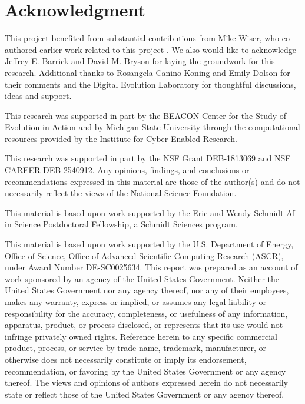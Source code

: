 \section*{Acknowledgment}

This project benefited from substantial contributions from Mike Wiser, who co-authored earlier work related to this project \citep{lalejini2017gene}.
We also would like to acknowledge Jeffrey E. Barrick and David M. Bryson for laying the groundwork for this research.
Additional thanks to Rosangela Canino-Koning and Emily Dolson for their comments and the Digital Evolution Laboratory for thoughtful discussions, ideas and support.

This research was supported in part by the BEACON Center for the Study of Evolution in Action and by Michigan State University through the computational resources provided by the Institute for Cyber-Enabled Research.

This research was supported in part by the NSF Grant DEB-1813069 and NSF CAREER DEB-2540912.
Any opinions, findings, and conclusions or recommendations expressed in this material are those of the author(s) and do not necessarily reflect the views of the National Science Foundation.

This material is based upon work supported by the Eric and Wendy Schmidt AI in Science Postdoctoral Fellowship, a Schmidt Sciences program.

This material is based upon work supported by the U.S. Department of Energy, Office of Science, Office of Advanced Scientific Computing Research (ASCR), under Award Number DE-SC0025634.
This report was prepared as an account of work sponsored by an agency of the United States Government.
Neither the United States Government nor any agency thereof, nor any of their employees, makes any warranty, express or implied, or assumes any legal liability or responsibility for the accuracy, completeness, or usefulness of any information, apparatus, product, or process disclosed, or represents that its use would not infringe privately owned rights.
Reference herein to any specific commercial product, process, or service by trade name, trademark, manufacturer, or otherwise does not necessarily constitute or imply its endorsement, recommendation, or favoring by the United States Government or any agency thereof.
The views and opinions of authors expressed herein do not necessarily state or reflect those of the United States Government or any agency thereof.

